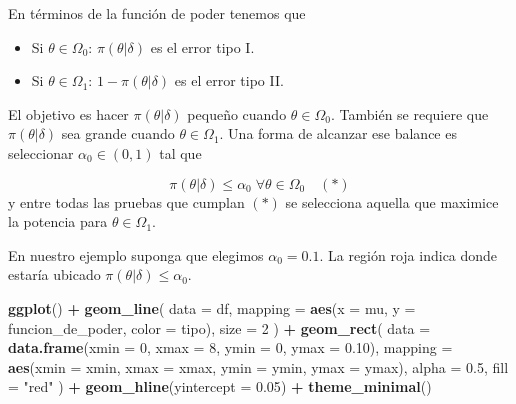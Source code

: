 \documentclass[
  12pt,
]{book}
\newenvironment{Shaded}{\begin{snugshade}}{\end{snugshade}}
\newcommand{\DataTypeTok}[1]{\textcolor[rgb]{0.13,0.29,0.53}{#1}}
\newcommand{\DecValTok}[1]{\textcolor[rgb]{0.00,0.00,0.81}{#1}}
\newcommand{\FloatTok}[1]{\textcolor[rgb]{0.00,0.00,0.81}{#1}}
\newcommand{\KeywordTok}[1]{\textcolor[rgb]{0.13,0.29,0.53}{\textbf{#1}}}
\newcommand{\NormalTok}[1]{#1}
\newcommand{\OperatorTok}[1]{\textcolor[rgb]{0.81,0.36,0.00}{\textbf{#1}}}
\newcommand{\StringTok}[1]{\textcolor[rgb]{0.31,0.60,0.02}{#1}}
\providecommand{\tightlist}{%
  \setlength{\itemsep}{0pt}\setlength{\parskip}{0pt}}
\begin{document}
En términos de la función de poder tenemos que

\begin{itemize}
\tightlist
\item
  Si \(\theta \in \Omega_0\): \(\pi(\theta|\delta)\) es el error tipo I.
\item
  Si \(\theta \in \Omega_1\): \(1-\pi(\theta|\delta)\) es el error tipo II.
\end{itemize}

El objetivo es hacer \(\pi(\theta|\delta)\) pequeño cuando \(\theta\in\Omega_0\).
También se requiere que \(\pi(\theta|\delta)\) sea grande cuando \(\theta \in\Omega_1\). Una forma de alcanzar ese balance es seleccionar \(\alpha_0 \in (0,1)\) tal que

\[\pi(\theta|\delta) \leq \alpha_0\;\forall \theta\in\Omega_0\quad(*)\]
y entre todas las pruebas que cumplan \((*)\) se selecciona aquella que maximice la potencia para \(\theta \in \Omega_1\).

En nuestro ejemplo suponga que elegimos \(\alpha_{0} = 0.1\). La región roja
indica donde estaría ubicado \(\pi(\theta\vert \delta)\leq \alpha_{0}\).

\begin{Shaded}
\begin{Highlighting}[]
\KeywordTok{ggplot}\NormalTok{() }\OperatorTok{+}
\StringTok{  }\KeywordTok{geom\_line}\NormalTok{(}
    \DataTypeTok{data =}\NormalTok{ df,}
    \DataTypeTok{mapping =} \KeywordTok{aes}\NormalTok{(}\DataTypeTok{x =}\NormalTok{ mu, }\DataTypeTok{y =}\NormalTok{ funcion\_de\_poder, }\DataTypeTok{color =}\NormalTok{ tipo), }\DataTypeTok{size =} \DecValTok{2}
\NormalTok{  ) }\OperatorTok{+}
\StringTok{  }\KeywordTok{geom\_rect}\NormalTok{(}
    \DataTypeTok{data =} \KeywordTok{data.frame}\NormalTok{(}\DataTypeTok{xmin =} \DecValTok{0}\NormalTok{, }\DataTypeTok{xmax =} \DecValTok{8}\NormalTok{, }\DataTypeTok{ymin =} \DecValTok{0}\NormalTok{, }\DataTypeTok{ymax =} \FloatTok{0.10}\NormalTok{),}
    \DataTypeTok{mapping =} \KeywordTok{aes}\NormalTok{(}\DataTypeTok{xmin =}\NormalTok{ xmin, }\DataTypeTok{xmax =}\NormalTok{ xmax, }\DataTypeTok{ymin =}\NormalTok{ ymin, }\DataTypeTok{ymax =}\NormalTok{ ymax),}
    \DataTypeTok{alpha =} \FloatTok{0.5}\NormalTok{, }\DataTypeTok{fill =} \StringTok{"red"}
\NormalTok{  ) }\OperatorTok{+}
\StringTok{  }\KeywordTok{geom\_hline}\NormalTok{(}\DataTypeTok{yintercept =} \FloatTok{0.05}\NormalTok{) }\OperatorTok{+}
\StringTok{  }\KeywordTok{theme\_minimal}\NormalTok{()}
\end{Highlighting}
\end{Shaded}
\end{document}
